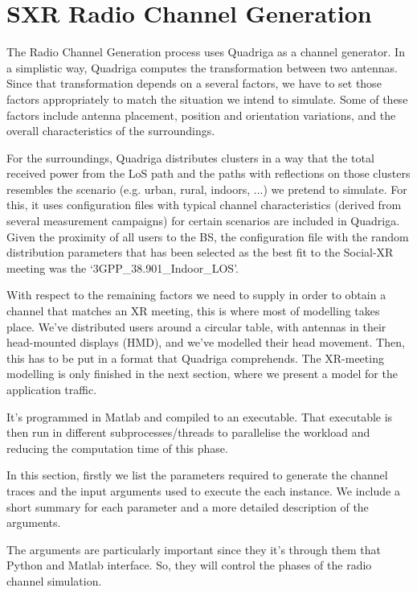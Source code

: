 \section{SXR Radio Channel Generation}
\label{sec:implementation}

The Radio Channel Generation process uses Quadriga as a channel generator. 
In a simplistic way, Quadriga computes the transformation between two antennas. Since that transformation depends on a several factors, we have to set those factors appropriately to match the situation we intend to simulate. Some of these factors include antenna placement, position and orientation variations, and the overall characteristics of the surroundings.


For the surroundings, Quadriga distributes clusters in a way that the total received power from the LoS path and the paths with reflections on those clusters resembles the scenario (e.g. urban, rural, indoors, ...) we pretend to simulate. For this, it uses configuration files with typical channel characteristics (derived from several measurement campaigns) for certain scenarios are included in Quadriga. Given the proximity of all users to the BS, the configuration file with the random distribution parameters that has been selected as the best fit to the Social-XR meeting was the `3GPP\_38.901\_Indoor\_LOS'.

With respect to the remaining factors we need to supply in order to obtain a channel that matches an XR meeting, this is where most of modelling takes place. We've distributed users around a circular table, with antennas in their head-mounted displays (HMD), and we've modelled their head movement. Then, this has to be put in a format that Quadriga comprehends. The XR-meeting modelling is only finished in the next section, where we present a model for the application traffic.

It's programmed in Matlab and compiled to an executable. That executable is then run in different subprocesses/threads to parallelise the workload and reducing the computation time of this phase.


In this section, firstly we list the parameters required to generate the channel traces and the input arguments used to execute the each instance. We include a short summary for each parameter and a more detailed description of the arguments.

The arguments are particularly important since they it's through them that Python and Matlab interface. So, they will control the phases of the radio channel simulation.

